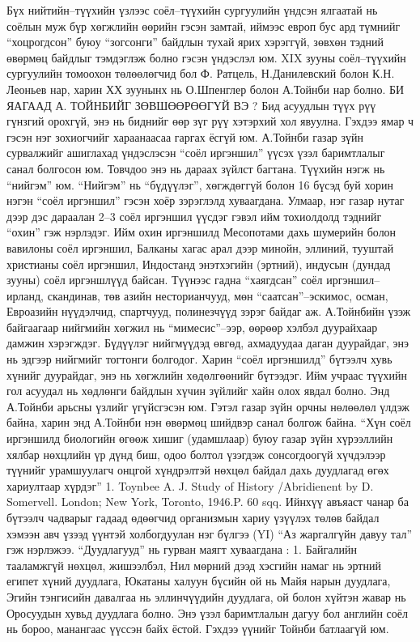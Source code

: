 Бүх нийтийн–түүхийн үзлээс соёл–түүхийн сургуулийн үндсэн ялгаатай нь соёлын муж бүр хөгжлийн өөрийн гэсэн замтай, иймээс европ бус ард түмнийг “хоцрогдсон” буюу “зогсонги” байдлын тухай ярих хэрэггүй, зөвхөн тэдний өвөрмөц байдлыг тэмдэглэж болно гэсэн үндэслэл юм. XIX зууны соёл–түүхийн сургуулийн томоохон төлөөлөгчид бол Ф. Ратцель, Н.Данилевский болон К.Н. Леоньев нар, харин ХХ зуунынх нь О.Шпенглер болон А.Тойнби нар болно.
БИ ЯАГААД А. ТОЙНБИЙГ ЗӨВШӨӨРӨӨГҮЙ ВЭ ?
Бид асуудлын түүх рүү гүнзгий орохгүй, энэ нь биднийг өөр зүг рүү хэтэрхий хол явуулна. Гэхдээ ямар ч гэсэн нэг зохиогчийг хараанаасаа гаргах ёсгүй юм. А.Тойнби газар зүйн сурвалжийг ашиглахад үндэслэсэн “соёл иргэншил” үүсэх үзэл баримтлалыг санал болгосон юм. Товчдоо энэ нь дараах зүйлст багтана.
Түүхийн нэгж нь “нийгэм” юм. “Нийгэм” нь “бүдүүлэг”, хөгждөггүй болон 16 бүсэд буй хорин нэгэн “соёл иргэншил” гэсэн хоёр зэрэглэлд хуваагдана. Улмаар, нэг газар нутаг дээр дэс дараалан 2–3 соёл иргэншил үүсдэг гэвэл ийм тохиолдолд тэднийг “охин” гэж нэрлэдэг. Ийм охин иргэншилд Месопотами дахь шумерийн болон вавилоны соёл иргэншил, Балканы хагас арал дээр минойн, эллиний, тууштай христианы соёл иргэншил, Индостанд энэтхэгийн (эртний), индусын (дундад зууны) соёл иргэншлүүд байсан. Түүнээс гадна “хаягдсан” соёл иргэншил–ирланд, скандинав, төв азийн несторианчууд, мөн “саатсан”–эскимос, осман, Евроазийн нүүдэлчид, спартчууд, полинезчүүд зэрэг байдаг аж.
А.Тойнбийн үзэж байгаагаар нийгмийн хөгжил нь “мимесис”–ээр, өөрөөр хэлбэл дуурайхаар дамжин хэрэгждэг. Бүдүүлэг нийгмүүдэд өвгөд, ахмадуудаа даган дуурайдаг, энэ нь эдгээр нийгмийг тогтонги болгодог. Харин “соёл иргэншилд” бүтээлч хувь хүнийг дуурайдаг, энэ нь хөгжлийн хөдөлгөөнийг бүтээдэг. Ийм учраас түүхийн гол асуудал нь хөдлөнги байдлын хүчин зүйлийг хайн олох явдал болно. Энд А.Тойнби арьсны үзлийг үгүйсгэсэн юм. Гэтэл газар зүйн орчны нөлөөлөл үлдэж байна, харин энд А.Тойнби нэн өвөрмөц шийдвэр санал болгож байна. “Хүн соёл иргэншилд биологийн өгөөж хишиг (удамшлаар) буюу газар зүйн хүрээллийн хялбар нөхцлийн үр дүнд биш, одоо болтол үзэгдэж сонсогдоогүй хүчдэлээр түүнийг урамшуулагч онцгой хүндрэлтэй нөхцөл байдал дахь дуудлагад өгөх хариултаар хүрдэг” 1. Toynbee A. J. Study of History /Abridienent by D. Somervell. London; New York, Toronto, 1946.P. 60 sqq.
Ийнхүү авъяаст чанар ба бүтээлч чадварыг гадаад өдөөгчид организмын хариу үзүүлэх төлөв байдал хэмээн авч үзээд үүнтэй холбогдуулан нэг бүлгээ (YI) “Аз жаргалгүйн давуу тал” гэж нэрлэжээ. “Дуудлагууд” нь гурван маягт хуваагдана :
1. Байгалийн тааламжгүй нөхцөл, жишээлбэл, Нил мөрний дээд хэсгийн намаг нь эртний египет хүний дуудлага, Юкатаны халуун бүсийн ой нь Майя нарын дуудлага, Эгийн тэнгисийн давалгаа нь эллинчүүдийн дуудлага, ой болон хүйтэн жавар нь Оросуудын хувьд дуудлага болно. Энэ үзэл баримтлалын дагуу бол английн соёл нь бороо, манангаас үүссэн байх ёстой. Гэхдээ үүнийг Тойнби батлаагүй юм.
